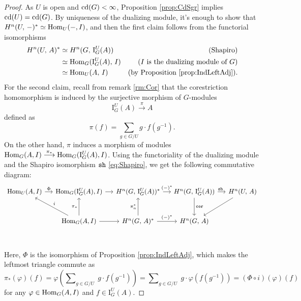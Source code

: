 \documentclass[a4paper, oneside]{memoir}
\begin{document}
\begin{proof}
    As \(U\) is open and \(\operatorname{cd}(G)<\infty\), Proposition \ref{prop:CdSgr} implies \(\operatorname{cd}(U)=\operatorname{cd}(G)\). By uniqueness of the dualizing module, it's enough to show that
    \(H^{n}( U, \, - )^*\simeq\operatorname{Hom}_U(-,I)\), and then the first claim follows from the functorial isomorphisms
    \begin{align*}
        H^{n}( U, \, A )^* & \simeq H^{n}( G, \, \mathrm{I}_G^U(A) )   & \text{(Shapiro)}                               \\
                      & \simeq \operatorname{Hom}_G(\mathrm{I}_G^U(A),\,I) & \text{($I$ is the dualizing module of $G$)}    \\
                      & \simeq \operatorname{Hom}_U(A,\,I)                 & \text{(by Proposition \ref{prop:IndLeftAdj})}.
    \end{align*}
    For the second claim, recall from remark \ref{rm:Cor} that the corestriction homomorphism is induced by the surjective morphism of \(G\)-modules
    \[\mathrm{I}_G^U(A) \overset{\pi}{\longrightarrow} A\]
    defined as
    \[ \pi(f)= \sum_{g\in G/U}{g\cdot f(g^{-1})}.\]
    On the other hand, $\pi$ induces a morphism of modules \(\operatorname{Hom}_G(A,I)\overset{\pi_*}{\longrightarrow}\operatorname{Hom}_G(\mathrm{I}_G^U(A),I)\).
    Using the functoriality of the dualizing module and the Shapiro isomorphism $\operatorname{\mathtt{sh}}$ \eqref{eq:Shapiro},
    we get the following commutative diagram:
    \[
        \begin{tikzcd}[column sep=small, row sep=large]
            \Hom_U(A,I)
            \rar["\Phi"] &
            \Hom_G(\mathrm{I}_G^U(A), I)
            \rar &
            \H{n}{G}{\mathrm{I}_G^U(A)}^*
            \rar["(-)^*"]&\H{n}{G}{\mathrm{I}_G^U(A)}
            \rar["\sh\ "]
            \ar[d, "\Cor"]&\H{n}{U}{A}\ar[dl] \\
            &
            \Hom_G(A,I) \ar[swap, lu, "i"]
            \ar[u, "\pi_*"]
            \rar &
            \H{n}{G}{A}^*
            \ar[u,"\pi_n^*"]
            \rar["(-)^*"] &
            \H{n}{G}{A} \\
        \end{tikzcd}
    \]
    Here, $\Phi$ is the isomorphism of Proposition \ref{prop:IndLeftAdj},
    which makes the leftmost triangle commute as
    \[
        \pi_*(\varphi)(f) = \varphi\left(\sum\nolimits_{g\in G/U}\;{g\cdot f(g^{-1} )}\right) = \sum\nolimits_{g\in G/U}\;{g\cdot \varphi(f(g^{-1}))} = (\Phi\circ i) (\varphi)(f)
    \]
    for any \(\varphi\in\operatorname{Hom}_G(A,I)\) and \(f\in\mathrm{I}_G^U(A)\).
\end{proof}
\end{document}
